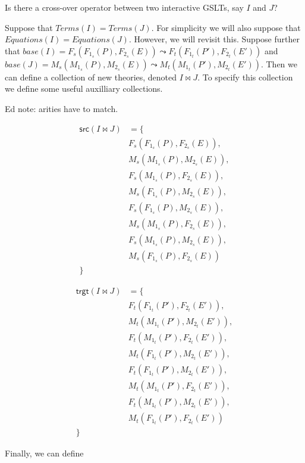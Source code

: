\documentclass{article}
\begin{document}
Is there a cross-over operator between two interactive GSLTs, say $I$ and $J$?

Suppose that $Terms( I ) = Terms( J )$. For simplicity we will also
suppose that $Equations( I ) = Equations( J )$. However, we will
revisit this.  Suppose further that $base( I ) = F_s( F_{1_s}( P ),
F_{2_s}( E ) ) \leadsto F_t( F_{1_t}( P' ), F_{2_t}( E' ) )$ and $base( J ) = M_s(
M_{1_s}( P ), M_{2_s}( E ) ) \leadsto M_t( M_{1_t}( P' ), M_{2_t}( E' ) )$.  Then we
can define a collection of new theories, denoted $I \Join J$. To
specify this collection we define some useful auxilliary collections.

Ed note: arities have to match.

\begin{align*}
  \mathsf{src}( I \Join J ) &= \{ \\
    & F_s( F_{1_s}( P ), F_{2_s}( E ) ),\\
    & M_s( M_{1_s}( P ), M_{2_s}( E ) ),\\
    & F_s( M_{1_s}( P ), F_{2_s}( E ) ),\\
    & M_s( F_{1_s}( P ), M_{2_s}( E ) ),\\
    & F_s( F_{1_s}( P ), M_{2_s}( E ) ),\\
    & M_s( M_{1_s}( P ), F_{2_s}( E ) ),\\
    & F_s( M_{1_s}( P ), M_{2_s}( E ) ),\\
    & M_s( F_{1_s}( P ), F_{2_s}( E ) )\\
  \}
\end{align*}

\begin{align*}
  \mathsf{trgt}( I \Join J ) &= \{ \\
    & F_t( F_{1_t}( P' ), F_{2_t}( E' ) ),\\
    & M_t( M_{1_t}( P' ), M_{2_t}( E' ) ),\\
    & F_t( M_{1_t}( P' ), F_{2_t}( E' ) ),\\
    & M_t( F_{1_t}( P' ), M_{2_t}( E' ) ),\\
    & F_t( F_{1_t}( P' ), M_{2_t}( E' ) ),\\
    & M_t( M_{1_t}( P' ), F_{2_t}( E' ) ),\\
    & F_t( M_{1_t}( P' ), M_{2_t}( E' ) ),\\
    & M_t( F_{1_t}( P' ), F_{2_t}( E' ) )\\
  \}
\end{align*}

Finally, we can define
\end{document}
